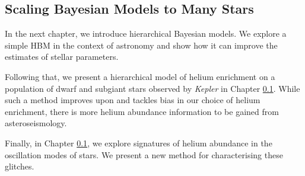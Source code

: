 \subsection{Scaling Bayesian Models to Many Stars}

In the next chapter, we introduce hierarchical Bayesian models. We explore a simple HBM in the context of astronomy and show how it can improve the estimates of stellar parameters.

Following that, we present a hierarchical model of helium enrichment on a population of dwarf and subgiant stars observed by \emph{Kepler} in Chapter \ref{}. While such a method improves upon and tackles bias in our choice of helium enrichment, there is more helium abundance information to be gained from asteroseismology.

Finally, in Chapter \ref{}, we explore signatures of helium abundance in the oscillation modes of stars. We present a new method for characterising these glitches.
